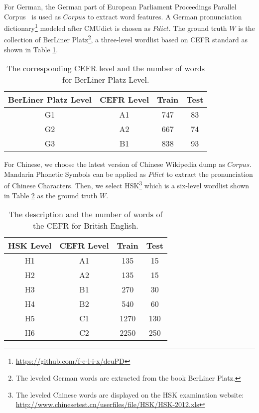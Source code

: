 For German, the German part of European Parliament Proceedings Parallel Corpus~\cite{koehn2005europarl} is used as $Corpus$ to extract word features.
A German pronunciation dictionary\footnote{\url{https://github.com/f-e-l-i-x/deuPD}} modeled after CMUdict 
is chosen as $Pdict$.
The ground truth $W$ is the collection of BerLiner Platz\footnote{The leveled German words are extracted from the book BerLiner Platz.}, a three-level wordlist based on CEFR standard as shown in Table \ref{tab:German}.

\begin{table}[th]
\scriptsize
\setlength{\abovecaptionskip}{0pt}
\setlength{\belowcaptionskip}{0pt}
	\begin{center}
		\begin{tabular}{cccc}
			\toprule[1pt]
			\textbf{BerLiner Platz Level}&\textbf{CEFR Level}& \textbf{Train} & \textbf{Test}\\
			\midrule
			G1 & A1 & 747 & 83\\
			G2 &A2& 667 & 74\\
			G3&B1& 838 & 93\\
			\bottomrule[1pt]
		\end{tabular}
	\end{center}
	\caption{\label{tab:German} The corresponding CEFR level and the number of words for BerLiner Platz Level.}
\end{table}

For Chinese, we choose the latest version of Chinese Wikipedia dump as $Corpus$.
Mandarin Phonetic Symbols can be applied as $Pdict$ to extract the pronunciation of Chinese Characters.
Then, we select HSK\footnote{The leveled Chinese words are displayed on the HSK examination website: \url{http://www.chinesetest.cn/userfiles/file/HSK/HSK-2012.xls}} which is a six-level wordlist shown in Table \ref{tab:HSK} as the ground truth $W$.

\begin{table}[ht]
\scriptsize
\setlength{\abovecaptionskip}{0pt}
\setlength{\belowcaptionskip}{0pt}
	\begin{center}
		\begin{tabular}{cccc}
			\toprule[1pt]
			\textbf{HSK Level}&\textbf{CEFR Level}& \textbf{Train} & \textbf{Test}\\
			\midrule
			H1&A1&135 &15\\
			H2&A2& 135& 15\\
		    H3&B1& 270&30\\
			H4&B2& 540&60\\
			H5&C1& 1270& 130\\ 
			H6&C2& 2250&250\\
			\bottomrule[1pt]
		\end{tabular}
	\end{center}
\caption{\label{tab:HSK} The description and the number of words of the CEFR for British English.}
\end{table}

